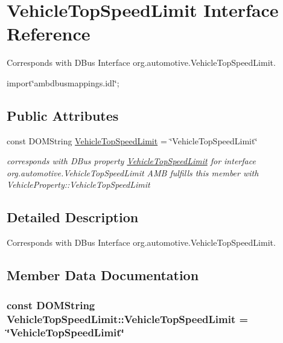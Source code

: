 \hypertarget{interfaceVehicleTopSpeedLimit}{\section{Vehicle\+Top\+Speed\+Limit Interface Reference}
\label{interfaceVehicleTopSpeedLimit}
}


Corresponds with D\+Bus Interface org.\+automotive.\+Vehicle\+Top\+Speed\+Limit.  




{\ttfamily import\char`\"{}ambdbusmappings.\+idl\char`\"{};}

\subsection*{Public Attributes}
\begin{DoxyCompactItemize}
\item 
const D\+O\+M\+String \hyperlink{interfaceVehicleTopSpeedLimit_a7bb5157a2806dc1486150162b0036fad}{Vehicle\+Top\+Speed\+Limit} = \char`\"{}Vehicle\+Top\+Speed\+Limit\char`\"{}
\begin{DoxyCompactList}\small\item\em corresponds with D\+Bus property \hyperlink{interfaceVehicleTopSpeedLimit}{Vehicle\+Top\+Speed\+Limit} for interface org.\+automotive.\+Vehicle\+Top\+Speed\+Limit A\+M\+B fulfills this member with Vehicle\+Property\+::\+Vehicle\+Top\+Speed\+Limit \end{DoxyCompactList}\end{DoxyCompactItemize}


\subsection{Detailed Description}
Corresponds with D\+Bus Interface org.\+automotive.\+Vehicle\+Top\+Speed\+Limit. 

\subsection{Member Data Documentation}
\hypertarget{interfaceVehicleTopSpeedLimit_a7bb5157a2806dc1486150162b0036fad}{
\subsubsection[{Vehicle\+Top\+Speed\+Limit}]{\setlength{\rightskip}{0pt plus 5cm}const D\+O\+M\+String Vehicle\+Top\+Speed\+Limit\+::\+Vehicle\+Top\+Speed\+Limit = \char`\"{}Vehicle\+Top\+Speed\+Limit\char`\"{}}}\label{interfaceVehicleTopSpeedLimit_a7bb5157a2806dc1486150162b0036fad}


